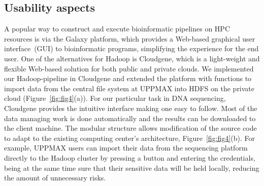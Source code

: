 \documentclass[11pt, oneside]{article}   	%
\begin{document}
\subsection{Usability aspects}
\label{subsectionIV_2}

A popular way to construct and execute bioinformatic pipelines on HPC resources is via the Galaxy\cite{galaxy} platform, which provides a Web-based graphical user interface~(GUI) to bioinformatic programs, simplifying the experience for the end user. 
One of the alternatives for Hadoop is Cloudgene\cite{cloudgene}, which is a light-weight and flexible Web-based solution for both public and private clouds. We implemented our Hadoop-pipeline in Cloudgene and extended the platform with functions to import data from the central file system at UPPMAX into HDFS on the private cloud (Figure~\ref{fig:fig4}(a)).
For our particular task in DNA sequencing, Cloudgene provides the intuitive interface making one easy to follow. Most of the data managing work is done automatically and the results can be downloaded to the client machine. The modular structure allows modification of the source code to adapt to the existing computing center’s architecture, Figure~\ref{fig:fig4}(b). For example, UPPMAX users can import their data from the sequencing platform directly to the Hadoop cluster by pressing a button and entering the credentials, being at the same time sure that their sensitive data will be held locally, reducing the amount of unnecessary risks.
\end{document}
